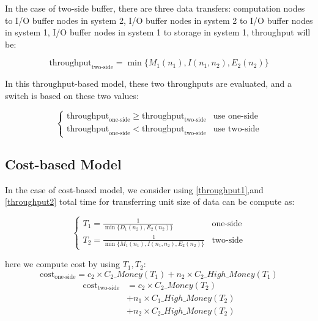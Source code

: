\documentclass[JIP,draft]{ipsj}
\begin{document}
In the case of two-side buffer, there are three data transfers: computation nodes to I/O buffer nodes in system 2, I/O buffer nodes in system 2 to I/O buffer nodes in system 1, I/O buffer nodes in system 1 to storage in system 1, throughput will be:

\begin{equation}
	\text{throughput}_{\text{two-side}}=\min\{M_1(n_1),I(n_1,n_2),E_2(n_2)\} \label{throughput2}
\end{equation}

In this throughput-based model, these two throughputs are evaluated, and a switch is based on these two values:

\begin{equation}
	\begin{cases}
		\text{throughput}_{\text{one-side}} \geq \text{throughput}_{\text{two-side}} & \text{use one-side}\\
		\text{throughput}_{\text{one-side}} < \text{throughput}_{\text{two-side}} & \text{use two-side}
	\end{cases}
\end{equation}

\subsection{Cost-based Model}
In the case of cost-based model, we consider
using \ref{throughput1},and \ref{throughput2} total time for transferring unit size of data can be compute as:

\begin{equation}
	\begin{cases}
		T_1=\frac{1}{\min\{D_1(n_2),E_2(n_2)\}} & \text{one-side}\\
		T_2=\frac{1}{\min\{M_1(n_1),I(n_1,n_2),E_2(n_2)\}} &\text{two-side}
	\end{cases}
\end{equation}

here we compute cost by using $T_1,T_2$:
\begin{equation}
	\text{cost}_\text{one-side}=c_2\times C_2\_Money(T_1)+n_2\times C_2\_High\_Money(T_1)
\end{equation}
\begin{align}
	\text{cost}_\text{two-side}&=c_2\times C_2\_Money(T_2)\\\nonumber 
				     &+n_1\times C_1\_High\_Money(T_2)\\ \nonumber
				     &+n_2\times C_2\_High\_Money(T_2)
\end{align}
\end{document}
